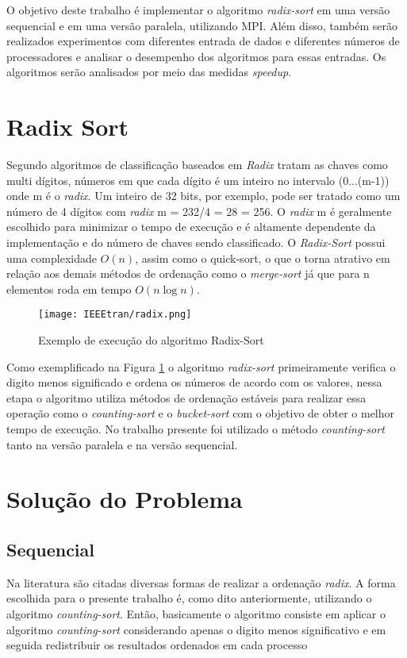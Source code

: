 \documentclass[journal]{IEEEtran}
\begin{document}
 O objetivo deste trabalho é implementar o algoritmo \textit{radix-sort}  em uma versão sequencial e em uma versão paralela, utilizando MPI. Além disso, também serão realizados experimentos com diferentes entrada de dados e diferentes números de processadores  e  analisar o desempenho dos algoritmos para essas entradas. Os algoritmos serão analisados por meio das medidas \textit{speedup}.


\section{Radix Sort}
\label{chapter:KDTree}
Segundo \cite{lee2002partitioned} algoritmos de classificação baseados em \textit{Radix} tratam as chaves como multi dígitos, números em que cada dígito é um inteiro no intervalo (0...(m-1)) onde m é o \textit{radix}. Um inteiro de  32 bits, por exemplo, pode ser tratado como um número de 4 dígitos com \textit{radix} m = 232/4 = 28 = 256. O \textit{radix} m é geralmente escolhido para minimizar o tempo de execução e é altamente dependente da implementação e do número de chaves sendo classificado. 
O \textit{Radix-Sort} possui uma complexidade $O(n)$, assim como o quick-sort, o que o torna atrativo em relação aos demais métodos de ordenação como o \textit{merge-sort} já que para n elementos roda em tempo $O(n\log{}n)$.


  \begin{figure}[ht]
    \centering
    \texttt{[image: IEEEtran/radix.png]}
    \caption{Exemplo de execução do algoritmo Radix-Sort}
    \label{fig:radix}
\end{figure}

Como exemplificado na Figura \ref{fig:radix} o algoritmo \textit{radix-sort} primeiramente verifica o digito menos significado e ordena os números de acordo com os valores, nessa etapa  o algoritmo utiliza métodos de ordenação estáveis para realizar essa operação como o \textit{counting-sort} e o \textit{bucket-sort} com o objetivo de obter o melhor tempo de execução. No trabalho presente foi utilizado o método \textit{counting-sort} tanto na versão paralela e na versão sequencial.

\section{Solução do Problema}
\label{chapter:solucao}
\subsection{Sequencial}
Na literatura são citadas diversas formas de realizar a ordenação \textit{radix}. A forma escolhida para o presente trabalho é, como dito anteriormente, utilizando o algoritmo \textit{counting-sort}. Então, basicamente o algoritmo consiste em aplicar o algoritmo \textit{counting-sort} considerando apenas o digito menos significativo e em seguida redistribuir os resultados ordenados em cada processo
\end{document}
